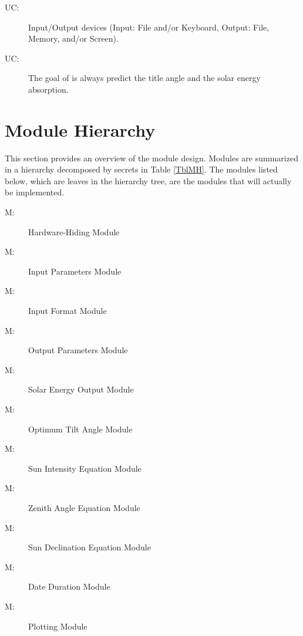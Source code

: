 \documentclass[12pt, titlepage]{article}
\newcounter{ucnum}
\newcommand{\uctheucnum}{UC\theucnum}
\newcounter{mnum}
\newcommand{\mthemnum}{M\themnum}
\begin{document}
\begin{description}
\item[ \uctheucnum \label{ucIO}:] Input/Output devices
  (Input: File and/or Keyboard, Output: File, Memory, and/or Screen).
\item[ \uctheucnum \label{ucIO}:] The goal of \progname
is always predict the title angle and the solar energy absorption.
\end{description}

\section{Module Hierarchy} \label{SecMH}

This section provides an overview of the module design. Modules are summarized
in a hierarchy decomposed by secrets in Table \ref{TblMH}. The modules listed
below, which are leaves in the hierarchy tree, are the modules that will
actually be implemented.

\begin{description}
\item [ \mthemnum \label{mHH}:] Hardware-Hiding Module
\item [ \mthemnum \label{mIP}:] Input Parameters Module
\item [ \mthemnum \label{mIF}:] Input Format Module
\item [ \mthemnum \label{mOP}:] Output Parameters Module
\item [ \mthemnum \label{mSEA}:] Solar Energy Output
Module\item [ \mthemnum \label{mOTA}:] Optimum Tilt Angle
Module
\item [ \mthemnum \label{mSI}:] Sun Intensity Equation
Module
\item [ \mthemnum \label{mZA}:] Zenith Angle Equation
Module
\item [ \mthemnum \label{mSD}:] Sun Declination Equation
Module
\item [ \mthemnum \label{mDD}:] Date Duration Module
\item [ \mthemnum \label{mP}:] Plotting Module
\end{description}
\end{document}
